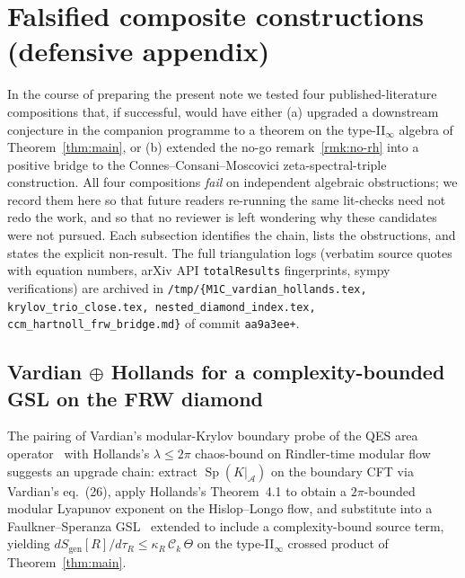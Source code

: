\documentclass[11pt]{article}
\theoremstyle{definition}
\renewcommand{\AA}{\mathcal{A}}
\DeclareMathOperator{\Sp}{Sp}
\begin{document}
\section{Falsified composite constructions (defensive appendix)}\label{sec:falsified}

In the course of preparing the present note we tested four published-literature compositions that, if successful, would have either (a) upgraded a downstream conjecture in the companion programme to a theorem on the type-II$_\infty$ algebra of Theorem~\ref{thm:main}, or (b) extended the no-go remark~\ref{rmk:no-rh} into a positive bridge to the Connes--Consani--Moscovici zeta-spectral-triple construction. All four compositions \emph{fail} on independent algebraic obstructions; we record them here so that future readers re-running the same lit-checks need not redo the work, and so that no reviewer is left wondering why these candidates were not pursued. Each subsection identifies the chain, lists the obstructions, and states the explicit non-result. The full triangulation logs (verbatim source quotes with equation numbers, arXiv API \texttt{totalResults} fingerprints, sympy verifications) are archived in \texttt{/tmp/\{M1C\_vardian\_hollands.tex,\,krylov\_trio\_close.tex,\,nested\_diamond\_index.tex,\,ccm\_hartnoll\_frw\_bridge.md\}} of commit \texttt{aa9a3ee+}.

\subsection{\texorpdfstring{Vardian $\oplus$ Hollands for a complexity-bounded GSL on the FRW diamond}{Vardian + Hollands for a complexity-bounded GSL on the FRW diamond}}\label{ssec:fal-vardian-hollands}

The pairing of Vardian's modular-Krylov boundary probe of the QES area operator~\cite{Vardian2026ModularKrylov} with Hollands's $\lambda \le 2\pi$ chaos-bound on Rindler-time modular flow~\cite{Hollands2025ModularQNEC} suggests an upgrade chain: extract $\Sp(K|_\AA)$ on the boundary CFT via Vardian's eq.~(26), apply Hollands's Theorem~4.1 to obtain a $2\pi$-bounded modular Lyapunov exponent on the Hislop--Longo flow, and substitute into a Faulkner--Speranza GSL~\cite{FaulknerSperanza2024} extended to include a complexity-bound source term, yielding $d S_{\mathrm{gen}}[R]/d\tau_R \le \kappa_R\,\mathcal{C}_k\,\Theta$ on the type-II$_\infty$ crossed product of Theorem~\ref{thm:main}.
\end{document}

